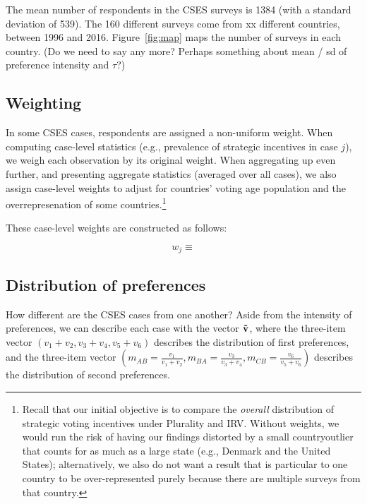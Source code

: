 \documentclass[11pt,a4paper]{article}
\begin{document}
The mean number of respondents in the CSES surveys is 1384 (with a standard deviation of 539). The 160 different surveys come from xx different countries, between 1996 and 2016. Figure~\ref{fig:map} maps the number of surveys in each country. (Do we need to say any more? Perhaps something about mean / sd of preference intensity and $\tau$?)

\subsection{Weighting}

In some CSES cases, respondents are assigned a non-uniform weight. When computing case-level statistics (e.g., prevalence of strategic incentives in case $j$), we weigh each observation by its original weight. When aggregating up even further, and presenting aggregate statistics (averaged over all cases), we also assign case-level weights to adjust for countries' voting age population and the overrepresenation of some countries.\footnote{Recall that our initial objective is to compare the \textit{overall} distribution of strategic voting incentives under Plurality and IRV. Without weights, we would run the risk of having our findings distorted by a small countryoutlier that counts for as much as a large state (e.g., Denmark and the United States); alternatively, we also do not want a result that is particular to one country to be over-represented purely because there are multiple surveys from that country.}

These case-level weights are constructed as follows:

\begin{equation}
	w_j \equiv
\end{equation}

\subsection{Distribution of preferences} 

How different are the CSES cases from one another? Aside from the intensity of preferences, we can describe each case with the vector $\bf \tilde{v}$, where the three-item vector $(v_1 + v_2, v_3 + v_4, v_5 + v_6)$ describes the distribution of first preferences, and the three-item vector $(m_{AB} = \frac{v_1}{v_1 + v_2}, m_{BA} = \frac{v_3}{v_3 + v_4}, m_{CB} = \frac{v_6}{v_5 + v_6})$ describes the distribution of second preferences. 
\end{document}
